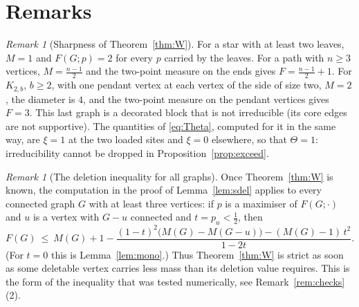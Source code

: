 \documentclass[11pt,a4paper]{article}
\theoremstyle{definition}
\theoremstyle{remark}
\newtheorem{remark}[theorem]{Remark}
\numberwithin{equation}{section}
\begin{document}
\section{Remarks}\label{sec:remarks}

\begin{remark}[Sharpness of Theorem~\ref{thm:W}]\label{rem:sharp}
For a star with at least two leaves, $M=1$ and $F(G;p)=2$ for every $p$ carried by
the leaves. For a path with $n\ge3$ vertices, $M=\frac{n-1}2$ and the two-point
measure on the ends gives $F=\frac{n-1}2+1$. For $K_{2,b}$, $b\ge2$, with one pendant
vertex at each vertex of the side of size two, $M=2$, the diameter is $4$, and the two-point measure on the
pendant vertices gives $F=3$. This last graph is a decorated block that is not
irreducible (its core edges are not supportive). The quantities of \eqref{eq:Theta},
computed for it in the same way, are $\xi=1$ at the two loaded sites and $\xi=0$
elsewhere, so that $\Theta=1$: irreducibility cannot be dropped in
Proposition~\ref{prop:exceed}.
\end{remark}

\begin{remark}[The deletion inequality for all graphs]\label{rem:allgraphs}
Once Theorem~\ref{thm:W} is known, the computation in the proof of
Lemma~\ref{lem:sdel} applies to every connected graph $G$ with at least three
vertices: if $p$ is a maximiser of $F(G;\cdot)$ and $u$ is a vertex with $G-u$
connected and $t=p_u<\frac12$, then
\[
 F(G)\ \le\ M(G)+1-\frac{(1-t)^2\bigl(M(G)-M(G-u)\bigr)-(M(G)-1)\,t^2}{1-2t}.
\]
(For $t=0$ this is Lemma~\ref{lem:mono}.) Thus Theorem~\ref{thm:W} is strict as soon
as some deletable vertex carries less mass than its deletion value requires. This is
the form of the inequality that was tested numerically, see
Remark~\ref{rem:checks}(2).
\end{remark}
\end{document}
